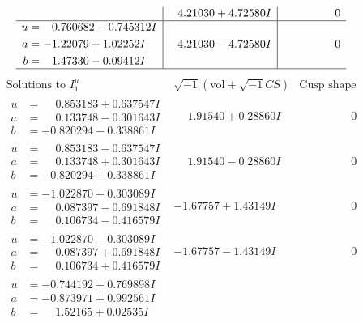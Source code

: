 \documentclass[1p]{elsarticle_modified}
\theoremstyle{definition}
\newcommand{\I}{\sqrt{-1}}
\begin{document}
$$\begin{array}{c|c|c}
 & \phantom{-}4.21030 + 4.72580 I & \phantom{-0.000000 } 0 \\ \hline\begin{aligned}
u &= \phantom{-}0.760682 - 0.745312 I \\
a &= -1.22079 + 1.02252 I \\
b &= \phantom{-}1.47330 - 0.09412 I\end{aligned}
 & \phantom{-}4.21030 - 4.72580 I & \phantom{-0.000000 } 0\\
 \hline 
 \end{array}$$\newpage$$\begin{array}{c|c|c}  
\text{Solutions to }I^u_{1}& \I (\text{vol} + \sqrt{-1}CS) & \text{Cusp shape}\\
 \hline 
\begin{aligned}
u &= \phantom{-}0.853183 + 0.637547 I \\
a &= \phantom{-}0.133748 - 0.301643 I \\
b &= -0.820294 - 0.338861 I\end{aligned}
 & \phantom{-}1.91540 + 0.28860 I & \phantom{-0.000000 } 0 \\ \hline\begin{aligned}
u &= \phantom{-}0.853183 - 0.637547 I \\
a &= \phantom{-}0.133748 + 0.301643 I \\
b &= -0.820294 + 0.338861 I\end{aligned}
 & \phantom{-}1.91540 - 0.28860 I & \phantom{-0.000000 } 0 \\ \hline\begin{aligned}
u &= -1.022870 + 0.303089 I \\
a &= \phantom{-}0.087397 - 0.691848 I \\
b &= \phantom{-}0.106734 - 0.416579 I\end{aligned}
 & -1.67757 + 1.43149 I & \phantom{-0.000000 } 0 \\ \hline\begin{aligned}
u &= -1.022870 - 0.303089 I \\
a &= \phantom{-}0.087397 + 0.691848 I \\
b &= \phantom{-}0.106734 + 0.416579 I\end{aligned}
 & -1.67757 - 1.43149 I & \phantom{-0.000000 } 0 \\ \hline\begin{aligned}
u &= -0.744192 + 0.769898 I \\
a &= -0.873971 + 0.992561 I \\
b &= \phantom{-}1.52165 + 0.02535 I\end{aligned}

\end{array}$$
\end{document}
